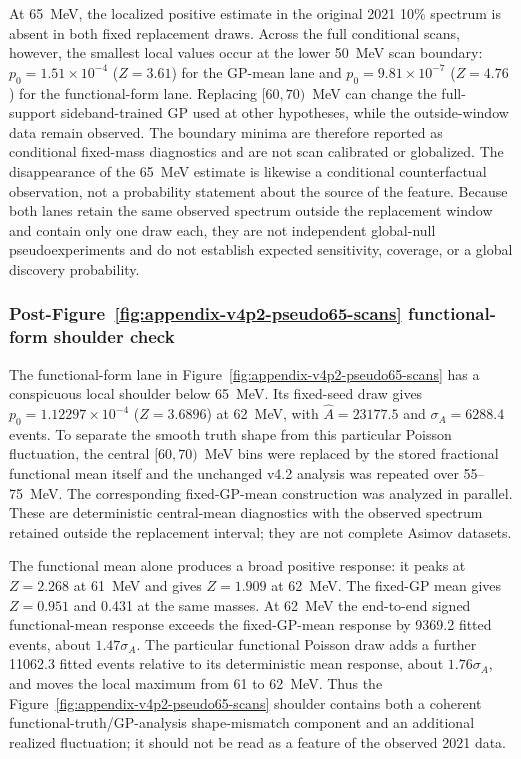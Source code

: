 At 65~MeV, the localized positive estimate in the original 2021 10\% spectrum
is absent in both fixed replacement draws.  Across the full conditional scans,
however, the smallest local values occur at the lower 50~MeV scan boundary:
$p_0=1.51\times10^{-4}$ ($Z=3.61$) for the GP-mean lane and
$p_0=9.81\times10^{-7}$ ($Z=4.76$) for the functional-form lane.  Replacing
$[60,70)$~MeV can change the full-support sideband-trained GP used at other
hypotheses, while the outside-window data remain observed.  The boundary
minima are therefore reported as conditional fixed-mass diagnostics and are
not scan calibrated or globalized.  The disappearance of the 65~MeV estimate
is likewise a conditional counterfactual observation, not a probability
statement about the source of the feature.  Because both lanes retain the
same observed spectrum outside the replacement window and contain only one
draw each, they are not independent global-null pseudoexperiments and do not
establish expected sensitivity, coverage, or a global discovery probability.

\subsubsection{Post-Figure~\ref{fig:appendix-v4p2-pseudo65-scans}
functional-form shoulder check}

The functional-form lane in
Figure~\ref{fig:appendix-v4p2-pseudo65-scans} has a conspicuous local shoulder
below 65~MeV.  Its fixed-seed draw gives
$p_0=1.12297\times10^{-4}$ ($Z=3.6896$) at 62~MeV, with
$\widehat A=23177.5$ and $\sigma_A=6288.4$ events.  To separate the smooth
truth shape from this particular Poisson fluctuation, the central
$[60,70)$~MeV bins were replaced by the stored fractional functional mean
itself and the unchanged v4.2 analysis was repeated over 55--75~MeV.
The corresponding fixed-GP-mean construction was analyzed in parallel.  These
are deterministic central-mean diagnostics with the observed spectrum retained
outside the replacement interval; they are not complete Asimov datasets.

The functional mean alone produces a broad positive response: it peaks at
$Z=2.268$ at 61~MeV and gives $Z=1.909$ at 62~MeV.  The fixed-GP mean gives
$Z=0.951$ and 0.431 at the same masses.  At 62~MeV the end-to-end signed
functional-mean response exceeds the fixed-GP-mean response by 9369.2 fitted
events, about $1.47\sigma_A$.  The particular functional Poisson draw adds a
further 11062.3 fitted events relative to its deterministic mean response,
about $1.76\sigma_A$, and moves the local maximum from 61 to 62~MeV.  Thus the
Figure~\ref{fig:appendix-v4p2-pseudo65-scans} shoulder contains both a coherent
functional-truth/GP-analysis shape-mismatch component and an additional
realized fluctuation; it should not be read as a feature of the observed 2021
data.

